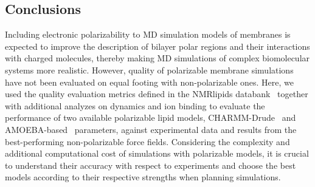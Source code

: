 \documentclass[journal=jctcce,manuscript=article,layout=singlecolumn]{achemso}
\begin{document}


\subsection{Conclusions}
Including electronic polarizability to MD simulation models of membranes is expected to improve the description of bilayer polar regions and their interactions with charged molecules, thereby making MD simulations of complex biomolecular systems more realistic. However, quality of polarizable membrane simulations have not been evaluated on equal footing with non-polarizable ones. Here, we used the quality evaluation metrics defined in the NMRlipids databank~\cite{Databank} together with additional analyzes on dynamics and ion binding to evaluate the performance of two available polarizable lipid models, CHARMM-Drude~\cite{li2017drude, yu2023drude} and AMOEBA-based~\cite{chu2018anionicpolarizable,chu2018polarizable} parameters, against
experimental data and results from the best-performing non-polarizable force fields. 
Considering the complexity and additional computational cost of simulations with polarizable models, it is crucial to understand their accuracy with respect to experiments and choose the best models according to their respective strengths when planning simulations.
\end{document}
